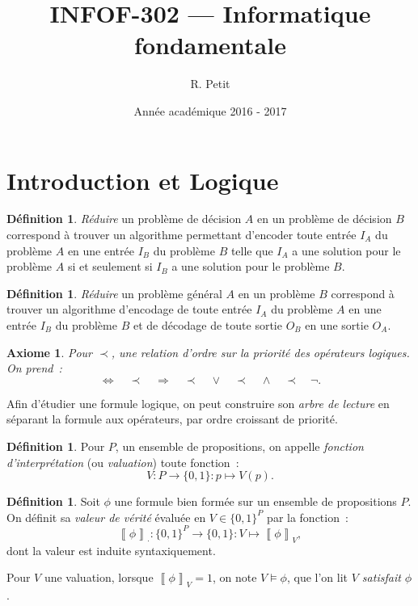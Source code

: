 \documentclass{article}
\title{INFOF-302 --- Informatique fondamentale}
\author{R. Petit}
\date{Année académique 2016 - 2017}
\newtheorem{axiome}[thm]{Axiome}
\theoremstyle{definition}
\newtheorem{déf}[thm]{Définition}
\theoremstyle{remark}
\newcommand{\logeval}[1]{\left\llbracket#1\right\rrbracket}
\begin{document}
\maketitle
\tableofcontents
\newpage
{}
\setcounter{page}{1}

\section{Introduction et Logique}
	\begin{déf} \textit{Réduire} un problème de décision $A$ en un problème de décision $B$ correspond à trouver un algorithme permettant d'encoder toute
	entrée $I_A$ du problème $A$ en une entrée $I_B$ du problème $B$ telle que $I_A$ a une solution pour le problème $A$ si et seulement si $I_B$
	a une solution pour le problème $B$.
	\end{déf}

	\begin{déf} \textit{Réduire} un problème général $A$ en un problème $B$ correspond à trouver un algorithme d'encodage de toute entrée $I_A$ du problème
	$A$ en une entrée $I_B$ du problème $B$ et de décodage de toute sortie $O_B$ en une sortie $O_A$.
	\end{déf}

	\begin{axiome} Pour $\prec$, une relation d'ordre sur la priorité des opérateurs logiques. On prend~:
	\[\Leftrightarrow \quad\prec\quad \Rightarrow \quad\prec\quad \lor \quad\prec\quad \land \quad\prec\quad \lnot.\]
	\end{axiome}

	Afin d'étudier une formule logique, on peut construire son \textit{arbre de lecture} en séparant la formule aux opérateurs, par ordre
	croissant de priorité.

	\begin{déf} Pour $P$, un ensemble de propositions, on appelle \textit{fonction d'interprétation} (ou \textit{valuation}) toute fonction~:
	\[V : P \to \{0, 1\} : p \mapsto V(p).\]
	\end{déf}

	\begin{déf} Soit $\phi$ une formule bien formée sur un ensemble de propositions $P$. On définit sa \textit{valeur de vérité} évaluée en $V \in \{0, 1\}^P$
	par la fonction~:
	\[\logeval \phi_\cdot : \{0, 1\}^P \to \{0, 1\} : V \mapsto \logeval \phi_V,\]
	dont la	valeur est induite syntaxiquement.

	Pour $V$ une valuation, lorsque $\logeval \phi_V = 1$, on note $V \models \phi$, que l'on lit \textit{$V$ satisfait $\phi$}.
	\end{déf}
\end{document}

